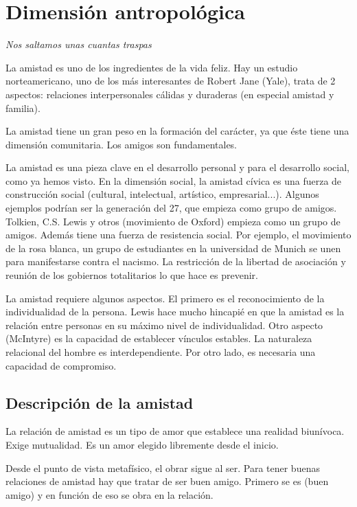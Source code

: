 \documentclass[palatino]{apuntesURJC}
\begin{document}
\section{Dimensión antropológica}

\textit{Nos saltamos unas cuantas traspas}

La amistad es uno de los ingredientes de la vida feliz.
%
Hay un estudio norteamericano, uno de los más interesantes de Robert Jane (Yale), trata de 2 aspectos: relaciones interpersonales cálidas y duraderas (en especial amistad y familia).

La amistad tiene un gran peso en la formación del carácter, ya que éste tiene una dimensión comunitaria. 
%
Los amigos son fundamentales.

La amistad es una pieza clave en el desarrollo personal y para el desarrollo social, como ya hemos visto.
%
En la dimensión social, la amistad cívica es una fuerza de construcción social (cultural, intelectual, artístico, empresarial...). Algunos ejemplos podrían ser la generación del 27, que empieza como grupo de amigos.
%
Tolkien, C.S. Lewis y otros (movimiento de Oxford) empieza como un grupo de amigos.
%
Además tiene una fuerza de resistencia social.
%
Por ejemplo, el movimiento de la rosa blanca, un grupo de estudiantes en la universidad de Munich se unen para manifestarse contra el nacismo.
%
La restricción de la libertad de asociación y reunión de los gobiernos totalitarios lo que hace es prevenir.


La amistad requiere algunos aspectos. El primero es el reconocimiento de la individualidad de la persona.
%
Lewis hace mucho hincapié en que la amistad es la relación entre personas en su máximo nivel de individualidad.
%
Otro aspecto (McIntyre) es la capacidad de establecer vínculos estables.
%
La naturaleza relacional del hombre es interdependiente.
%
Por otro lado, es necesaria una capacidad de compromiso.

\subsection{Descripción de la amistad}

La relación de amistad es un tipo de amor que establece una realidad biunívoca.
%
Exige mutualidad.
%
Es un amor elegido libremente desde el inicio.

Desde el punto de vista metafísico, el obrar sigue al ser.
%
Para tener buenas relaciones de amistad hay que tratar de ser buen amigo.
%
Primero se es (buen amigo) y en función de eso se obra en la relación.
\end{document}

